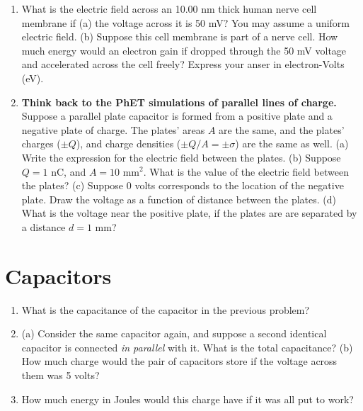 \documentclass[10pt]{article}
\begin{document}
\begin{enumerate}
\item What is the electric field across an 10.00 nm thick human nerve cell membrane if (a) the voltage across it is 50 mV? You may assume a uniform electric field. (b) Suppose this cell membrane is part of a nerve cell.  How much energy would an electron gain if dropped through the 50 mV voltage and accelerated across the cell freely?  Express your anser in electron-Volts (eV). \\ \vspace{2cm}
\item \textbf{Think back to the PhET simulations of parallel lines of charge.}  Suppose a parallel plate capacitor is formed from a positive plate and a negative plate of charge.  The plates' areas $A$ are the same, and the plates' charges ($\pm Q$), and charge densities ($\pm Q/A = \pm \sigma$) are the same as well. (a) Write the expression for the electric field between the plates. (b) Suppose $Q = 1$ nC, and $A = 10$ mm$^2$.  What is the value of the electric field between the plates?  (c) Suppose 0 volts corresponds to the location of the negative plate.  Draw the voltage as a function of distance between the plates.  (d) What is the voltage near the positive plate, if the plates are are separated by a distance $d = 1$ mm? \\ \vspace{2cm}
\end{enumerate}

\section{Capacitors}

\begin{enumerate}
\item What is the capacitance of the capacitor in the previous problem? \\ \vspace{1cm}
\item (a) Consider the same capacitor again, and suppose a second identical capacitor is connected \textit{in parallel} with it.  What is the total capacitance? (b) How much charge would the pair of capacitors store if the voltage across them was 5 volts? \\ \vspace{1.5cm}
\item How much energy in Joules would this charge have if it was all put to work? \\ \vspace{1cm}
\end{enumerate}
\end{document}
